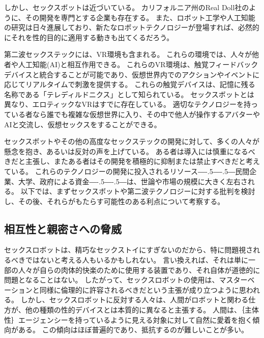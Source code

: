 \documentclass[paper=a4,book,openany]{jlreq}
\def\DDASH{―\kern-.5\zw―\kern-.5\zw―} %
\begin{document}
しかし、セックスボットは近づいている。
カリフォルニア州のReal Doll社のように、その開発を専門とする企業も存在する。
また、ロボット工学や人工知能の研究は日々進展しており、新たなロボットテクノロジーが登場すれば、必然的にそれを性的目的に適用する動きも出てくるだろう。

第二波セックステックには、VR環境も含まれる。
これらの環境では、人々が他者や人工知能(AI)と相互作用できる。
これらのVR環境は、触覚フィードバックデバイスと統合することが可能であり、仮想世界内でのアクションやイベントに応じてリアルタイムで刺激を提供する。
これらの触覚デバイスは、記憶に残る名称である「テレディルドニクス」として知られている。
セックスボットとは異なり、エロティックなVRはすでに存在している。
適切なテクノロジーを持っている者なら誰でも複雑な仮想世界に入り、その中で他人が操作するアバターやAIと交流し、仮想セックスをすることができる。

セックスボットやその他の高度なセックステックの開発に対して、多くの人々が懸念を抱き、あるいは反対の声を上げている。
ある者は導入には慎重になるべきだと主張し、またある者はその開発を積極的に抑制または禁止すべきだと考えている。
これらのテクノロジーの開発に投入されるリソース{\DDASH}民間企業、大学、政府による資金{\DDASH}は、世論や市場の規模に大きく左右される。
以下では、まずセックスボットや第二波テクノロジーに対する批判を検討し、その後、それらがもたらす可能性のある利点について考察する。

\subsection{相互性と親密さへの脅威}

セックスロボットは、精巧なセックストイにすぎないのだから、特に問題視されるべきではないと考える人もいるかもしれない。
言い換えれば、それは単に一部の人々が自らの肉体的快楽のために使用する装置であり、それ自体が道徳的に問題となることはない。
したがって、セックスロボットの使用は、マスターベーションと同様に倫理的に許容されるべきだという主張が成り立つように思われる。
しかし、セックスロボットに反対する人々は、人間がロボットと関わる仕方が、他の種類の性的デバイスとは本質的に異なると主張する。
人間は、｛主体性｝{エージェンシー}を持っているように見える対象に対して自然に愛着を抱く傾向がある。
この傾向はほぼ普遍的であり、抵抗するのが難しいことが多い。
\end{document}
